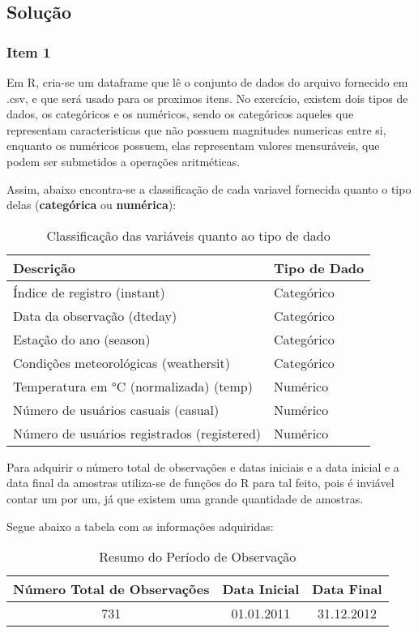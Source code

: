 \documentclass[a4paper,11pt]{article}
\begin{document}
\subsection{Solução}
\subsubsection{Item 1}

Em R, cria-se um dataframe que lê o conjunto de dados do arquivo fornecido em .csv, e que será usado para os proximos itens. No exercício, existem dois tipos de dados, os categóricos e os numéricos, sendo os categóricos aqueles que representam caracteristicas que não possuem magnitudes numericas entre si, enquanto os numéricos possuem, elas representam valores mensuráveis, que podem ser submetidos a operações aritméticas.

Assim, abaixo encontra-se a classificação de cada variavel fornecida quanto o tipo delas (\textbf{categórica} ou \textbf{numérica}):

\newpage
\begin{table}[h!]
\centering
\caption{Classificação das variáveis quanto ao tipo de dado}
\begin{tabular}{|l|l|}
\hline
\textbf{Descrição} & \textbf{Tipo de Dado} \\ \hline
Índice de registro (instant) & Categórico \\ \hline
Data da observação (dteday) & Categórico \\ \hline
Estação do ano (season) & Categórico \\ \hline
Condições meteorológicas (weathersit) & Categórico \\ \hline
Temperatura em °C (normalizada) (temp) & Numérico \\ \hline
Número de usuários casuais (casual) & Numérico \\ \hline
Número de usuários registrados (registered) & Numérico \\ \hline
\end{tabular}
\end{table}

Para adquirir o número total de observações e datas iniciais e a data inicial e a data final da amostras utiliza-se de funções do R para tal feito, pois é inviável contar um por um, já que existem uma grande quantidade de amostras. 

Segue abaixo a tabela com as informações adquiridas:

\begin{table}[h]
\centering
\caption{Resumo do Período de Observação}
\label{tab:resumo_observacao}
\begin{tabular}{|c|c|c|}
\hline
\textbf{Número Total de Observações} & \textbf{Data Inicial} & \textbf{Data Final} \\
\hline
731 & 01.01.2011 & 31.12.2012 \\
\hline
\end{tabular}
\end{table}
\end{document}
